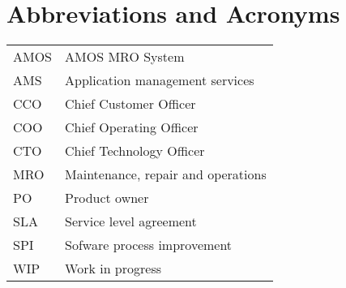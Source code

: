\chapter*{Abbreviations and Acronyms}


\noindent

\begin{longtable}{@{}p{}p{}@{}}
AMOS 	& AMOS MRO System \\
AMS 	& Application management services \\
CCO 	& Chief Customer Officer \\
COO 	& Chief Operating Officer \\
CTO 	& Chief Technology Officer \\
MRO 	& Maintenance, repair and operations \\
PO		& Product owner \\
SLA 	& Service level agreement \\
SPI		& Sofware process improvement \\
WIP		& Work in progress

\end{longtable}

